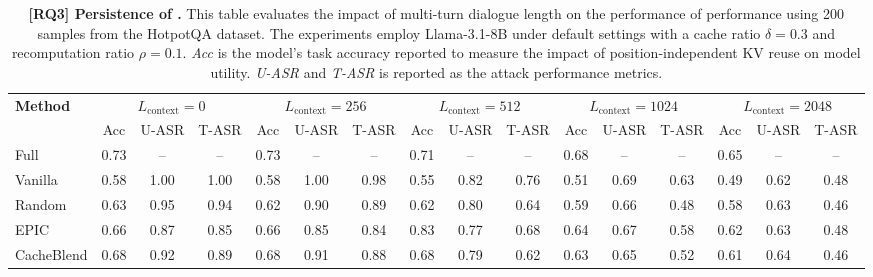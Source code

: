 \begin{table}[t]
\centering
\footnotesize
\caption{\textbf{[RQ3] Persistence of \sys.} 
This table evaluates the impact of multi-turn dialogue length on the performance of \sys performance using 200 samples from the HotpotQA dataset. The experiments employ Llama-3.1-8B under default settings with a cache ratio $\delta = 0.3$ and recomputation ratio $\rho=0.1$. \textit{Acc} is the model's task accuracy reported to measure the impact of position-independent KV reuse on model utility. \textit{U-ASR} and \textit{T-ASR} is reported as the attack performance metrics. }
\label{tab:rq3_asr_vs_context_length}
\setlength{\tabcolsep}{0pt} 
\begin{tabular*}{\textwidth}{@{\extracolsep{\fill}} l ccc ccc ccc ccc ccc }
\toprule
\multirow{2}{*}{\textbf{Method}} & \multicolumn{3}{c}{$L_\mathrm{context} = 0$} & \multicolumn{3}{c}{$L_\mathrm{context} = 256$} & \multicolumn{3}{c}{$L_\mathrm{context} = 512$} & \multicolumn{3}{c}{$L_\mathrm{context} = 1024$} & \multicolumn{3}{c}{$L_\mathrm{context} = 2048$} \\
\cmidrule(lr){2-4} \cmidrule(lr){5-7} \cmidrule(lr){8-10} \cmidrule(lr){11-13} \cmidrule(lr){14-16}
 & Acc & U-ASR & T-ASR & Acc & U-ASR & T-ASR & Acc & U-ASR & T-ASR & Acc & U-ASR & T-ASR & Acc & U-ASR & T-ASR \\
\midrule
Full        & 0.73 & --    & --    & 0.73 & -- & -- & 0.71 & -- & -- & 0.68 & -- & -- & 0.65 & -- & -- \\
Vanilla     & 0.58 & 1.00 & 1.00 & 0.58 & 1.00 & 0.98 & 0.55 & 0.82 & 0.76 & 0.51 & 0.69 & 0.63 & 0.49 & 0.62 & 0.48 \\
Random      & 0.63 & 0.95 & 0.94 & 0.62 & 0.90 & 0.89 & 0.62 & 0.80 & 0.64 & 0.59 & 0.66 & 0.48 & 0.58 & 0.63 & 0.46 \\
EPIC        & 0.66 & 0.87 & 0.85 & 0.66 & 0.85 & 0.84 & 0.83 & 0.77 & 0.68 & 0.64 & 0.67 & 0.58 & 0.62 & 0.63 & 0.48 \\
CacheBlend  & 0.68 & 0.92 & 0.89 & 0.68 & 0.91 & 0.88 & 0.68 & 0.79 & 0.62 & 0.63 & 0.65 & 0.52 & 0.61 & 0.64 & 0.46 \\
\bottomrule
\end{tabular*}
\end{table}
